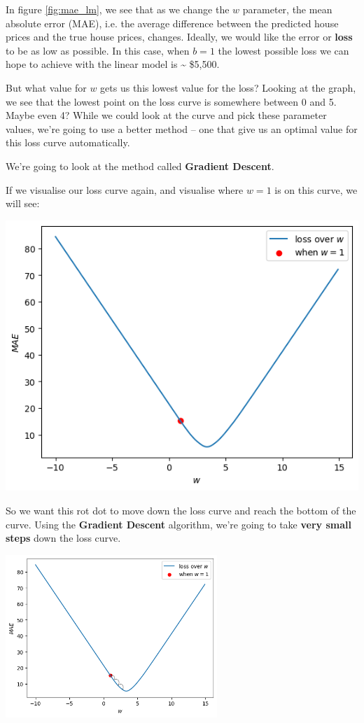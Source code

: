 \documentclass[10pt]{beamer}
\begin{document}
In figure \ref{fig:mae_lm}, we see that as we change the \(w\) parameter, the mean absolute
error (MAE), i.e. the average difference between the predicted house prices and the
true house prices, changes. Ideally, we would like the error or \textbf{loss} to be as low as
possible. In this case, when \(b = 1\) the lowest possible loss we can hope to achieve
with the linear model is \textasciitilde{} \$5,500.

But what value for \(w\) gets us this lowest value for the loss? Looking at the graph,
we see that the lowest point on the loss curve is somewhere between 0 and 5. Maybe
even 4? While we could look at the curve and pick these parameter values, we're going
to use a better method -- one that give us an optimal value for this loss curve
automatically.

We're going to look at the method called \textbf{Gradient Descent}.

If we visualise our loss curve again, and visualise where \(w = 1\) is on this curve,
we will see:

\begin{center}
\includegraphics[width=.9\linewidth]{images/loss_curve_w_1.png}
\end{center}

So we want this rot dot to move down the loss curve and reach the bottom of the
curve. Using the \textbf{Gradient Descent} algorithm, we're going to take \textbf{very small steps}
down the loss curve.

\begin{center}
\includegraphics[width=0.6\textwidth]{images/loss_curve_w_1_with_path.png}
\end{center}
\end{document}
